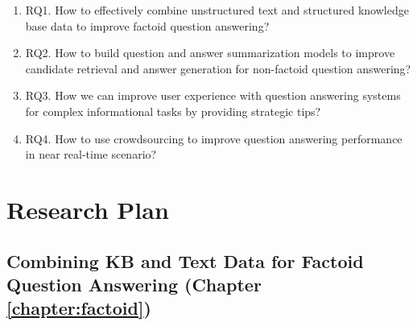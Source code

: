 \begin{enumerate}
\item RQ1. How to effectively combine unstructured text and structured knowledge base data to improve factoid question answering?


\item RQ2. How to build question and answer summarization models to improve candidate retrieval and answer generation for non-factoid question answering?
\item RQ3. How we can improve user experience with question answering systems for complex informational tasks by providing strategic tips?
\item RQ4. How to use crowdsourcing to improve question answering performance in near real-time scenario?
\end{enumerate}


\section{Research Plan}


\subsection{Combining KB and Text Data for Factoid Question Answering (Chapter \ref{chapter:factoid})}
\label{sec:plan1}


